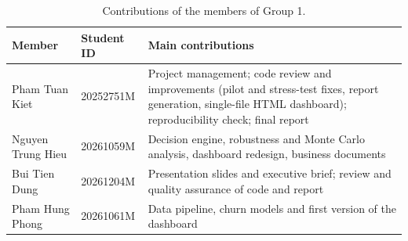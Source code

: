 \documentclass[11pt,a4paper]{article}
\begin{document}
\begin{table}[H]
\centering\small
\caption{Contributions of the members of Group 1.}\label{tab:team}
\begin{tabularx}{\linewidth}{@{}p{3.6cm}p{2.4cm}X@{}}
\toprule
\textbf{Member} & \textbf{Student ID} & \textbf{Main contributions} \\
\midrule
Pham Tuan Kiet & 20252751M & Project management; code review and improvements (pilot and stress-test fixes, report generation, single-file HTML dashboard); reproducibility check; final report \\
Nguyen Trung Hieu & 20261059M & Decision engine, robustness and Monte Carlo analysis, dashboard redesign, business documents \\
Bui Tien Dung & 20261204M & Presentation slides and executive brief; review and quality assurance of code and report \\
Pham Hung Phong & 20261061M & Data pipeline, churn models and first version of the dashboard \\
\bottomrule
\end{tabularx}
\end{table}
\end{document}
